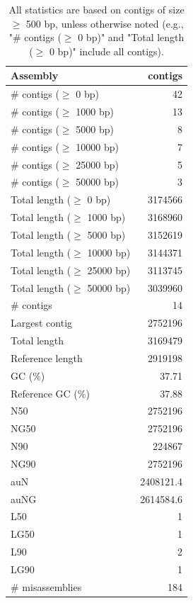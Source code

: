 \documentclass[12pt,a4paper]{article}
\begin{document}
\begin{table}[ht]
\begin{center}
\caption{All statistics are based on contigs of size $\geq$ 500 bp, unless otherwise noted (e.g., "\# contigs ($\geq$ 0 bp)" and "Total length ($\geq$ 0 bp)" include all contigs).}
\begin{tabular}{|l*{1}{|r}|}
\hline
Assembly & contigs \\ \hline
\# contigs ($\geq$ 0 bp) & 42 \\ \hline
\# contigs ($\geq$ 1000 bp) & 13 \\ \hline
\# contigs ($\geq$ 5000 bp) & 8 \\ \hline
\# contigs ($\geq$ 10000 bp) & 7 \\ \hline
\# contigs ($\geq$ 25000 bp) & 5 \\ \hline
\# contigs ($\geq$ 50000 bp) & 3 \\ \hline
Total length ($\geq$ 0 bp) & 3174566 \\ \hline
Total length ($\geq$ 1000 bp) & 3168960 \\ \hline
Total length ($\geq$ 5000 bp) & 3152619 \\ \hline
Total length ($\geq$ 10000 bp) & 3144371 \\ \hline
Total length ($\geq$ 25000 bp) & 3113745 \\ \hline
Total length ($\geq$ 50000 bp) & 3039960 \\ \hline
\# contigs & 14 \\ \hline
Largest contig & 2752196 \\ \hline
Total length & 3169479 \\ \hline
Reference length & 2919198 \\ \hline
GC (\%) & 37.71 \\ \hline
Reference GC (\%) & 37.88 \\ \hline
N50 & 2752196 \\ \hline
NG50 & 2752196 \\ \hline
N90 & 224867 \\ \hline
NG90 & 2752196 \\ \hline
auN & 2408121.4 \\ \hline
auNG & 2614584.6 \\ \hline
L50 & 1 \\ \hline
LG50 & 1 \\ \hline
L90 & 2 \\ \hline
LG90 & 1 \\ \hline
\# misassemblies & 184 \\ \hline

\end{tabular}
\end{center}
\end{table}
\end{document}
